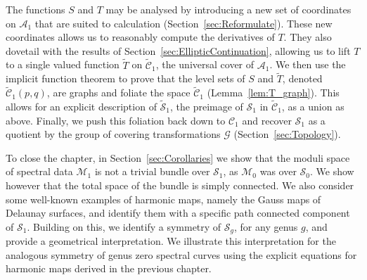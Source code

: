 The functions $S$ and $T$ may be analysed by introducing a new set of coordinates on $\mathcal{A}_1$ that are suited to calculation (Section~\ref{sec:Reformulate}).
These new coordinates allows us to reasonably compute the derivatives of $T$. They also dovetail with the results of Section~\ref{sec:EllipticContinuation}, allowing us to lift $T$ to a  single valued function $\tilde{T}$ on $\mathcal{\tilde{C}}_1$, the universal cover of $\mathcal{A}_1$.
We then use the implicit function theorem to prove that the level sets of $S$ and $\tilde{T}$, denoted $\mathcal{\tilde{C}}_1(p,q)$, are graphs and foliate the space $\mathcal{\tilde{C}}_1$ (Lemma~\ref{lem:T_graph}). This allows for an explicit description of $\mathcal{\tilde{S}}_1$, the preimage of $\mathcal{S}_1$ in $\mathcal{\tilde{C}}_1$, as a union as above.
Finally, we push this foliation back down to $\mathcal{C}_1$ and recover $\mathcal{S}_1$ as a quotient by the group of covering transformations $\mathcal{G}$ (Section~\ref{sec:Topology}).

To close the chapter, in Section~\ref{sec:Corollaries} we show that the moduli space of spectral data $\mathcal{M}_1$ is not a trivial bundle over $\mathcal{S}_1$, as $\mathcal{M}_0$ was over $\mathcal{S}_0$. We show however that the total space of the bundle is simply connected. We also consider some well-known examples of harmonic maps, namely the Gauss maps of Delaunay surfaces, and identify them with a specific path connected component of $\mathcal{S}_1$. Building on this, we identify a symmetry of $\mathcal{S}_g$, for any genus $g$, and provide a geometrical interpretation. We illustrate this interpretation for the analogous symmetry of genus zero spectral curves using the explicit equations for harmonic maps derived in the previous chapter.

